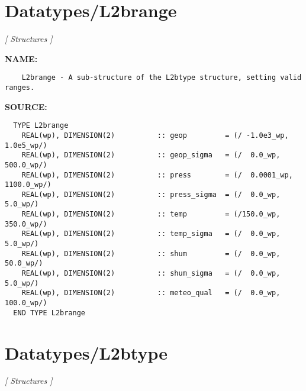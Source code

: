 \section{Datatypes/L2brange}
\textsl{[ Structures ]}

\label{ch:robo40}
\label{ch:Datatypes_L2brange}
\textbf{NAME:}\hspace{0.08in}\begin{Verbatim}
    L2brange - A sub-structure of the L2btype structure, setting valid ranges.
\end{Verbatim}
\textbf{SOURCE:}\hspace{0.08in}\begin{Verbatim}
  TYPE L2brange
    REAL(wp), DIMENSION(2)          :: geop         = (/ -1.0e3_wp,   1.0e5_wp/)
    REAL(wp), DIMENSION(2)          :: geop_sigma   = (/  0.0_wp,   500.0_wp/)
    REAL(wp), DIMENSION(2)          :: press        = (/  0.0001_wp, 1100.0_wp/)
    REAL(wp), DIMENSION(2)          :: press_sigma  = (/  0.0_wp,     5.0_wp/)
    REAL(wp), DIMENSION(2)          :: temp         = (/150.0_wp,   350.0_wp/)
    REAL(wp), DIMENSION(2)          :: temp_sigma   = (/  0.0_wp,     5.0_wp/)
    REAL(wp), DIMENSION(2)          :: shum         = (/  0.0_wp,    50.0_wp/)
    REAL(wp), DIMENSION(2)          :: shum_sigma   = (/  0.0_wp,     5.0_wp/)
    REAL(wp), DIMENSION(2)          :: meteo_qual   = (/  0.0_wp,   100.0_wp/)
  END TYPE L2brange
\end{Verbatim}
\section{Datatypes/L2btype}
\textsl{[ Structures ]}

